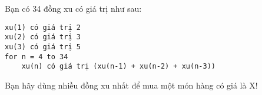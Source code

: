 Bạn có 34 đồng xu có giá trị như sau:  
\begin{verbatim}
xu(1) có giá trị 2
xu(2) có giá trị 3
xu(3) có giá trị 5
for n = 4 to 34
    xu(n) có giá trị (xu(n-1) + xu(n-2) + xu(n-3))
\end{verbatim}

   Bạn hãy dùng nhiều đồng xu nhất để mua một món hàng có giá là X!